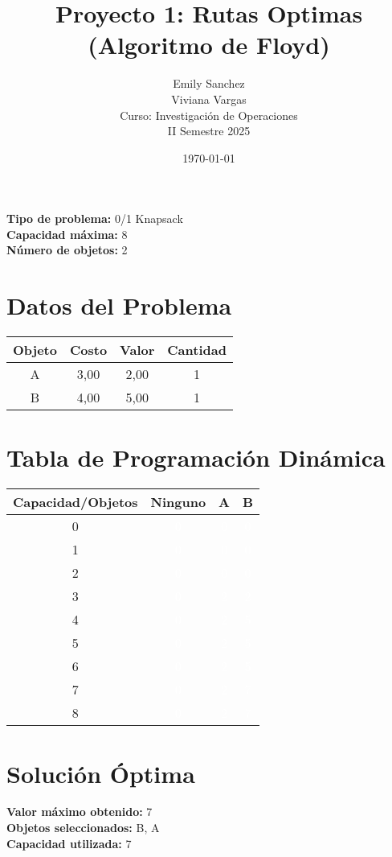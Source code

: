 \documentclass{article}
\title{Proyecto 1: Rutas Optimas (Algoritmo de Floyd)}
\author{Emily Sanchez \\ Viviana Vargas \\[1cm] Curso: Investigación de Operaciones \\ II Semestre 2025}
\date{\today}
\begin{document}
\maketitle

\thispagestyle{empty}
\newpage
\setcounter{page}{1}

\textbf{Tipo de problema:} 0/1 Knapsack\\
\textbf{Capacidad máxima:} 8\\
\textbf{Número de objetos:} 2\\

\clearpage
\section*{Datos del Problema}
\begin{tabular}{|c|c|c|c|}
\hline
Objeto & Costo & Valor & Cantidad \\
\hline
A & 3,00 & 2,00 & 1 \\
B & 4,00 & 5,00 & 1 \\
\hline
\end{tabular}

\section*{Tabla de Programación Dinámica}
\begin{center}
\scriptsize
\begin{tabular}{|c|c|c|c|}
\hline
Capacidad/Objetos & Ninguno & A & B \\ \hline
0 & \cellcolor{rojo}\textcolor{white}{0} & \cellcolor{rojo}\textcolor{white}{0} & \cellcolor{rojo}\textcolor{white}{0} \\ \hline
1 & \cellcolor{rojo}\textcolor{white}{0} & \cellcolor{rojo}\textcolor{white}{0} & \cellcolor{rojo}\textcolor{white}{0} \\ \hline
2 & \cellcolor{rojo}\textcolor{white}{0} & \cellcolor{rojo}\textcolor{white}{0} & \cellcolor{rojo}\textcolor{white}{0} \\ \hline
3 & \cellcolor{rojo}\textcolor{white}{0} & \cellcolor{verde}\textcolor{white}{2} & \cellcolor{rojo}\textcolor{white}{2} \\ \hline
4 & \cellcolor{rojo}\textcolor{white}{0} & \cellcolor{verde}\textcolor{white}{2} & \cellcolor{verde}\textcolor{white}{5} \\ \hline
5 & \cellcolor{rojo}\textcolor{white}{0} & \cellcolor{verde}\textcolor{white}{2} & \cellcolor{verde}\textcolor{white}{5} \\ \hline
6 & \cellcolor{rojo}\textcolor{white}{0} & \cellcolor{verde}\textcolor{white}{2} & \cellcolor{verde}\textcolor{white}{5} \\ \hline
7 & \cellcolor{rojo}\textcolor{white}{0} & \cellcolor{verde}\textcolor{white}{2} & \cellcolor{verde}\textcolor{white}{7} \\ \hline
8 & \cellcolor{rojo}\textcolor{white}{0} & \cellcolor{verde}\textcolor{white}{2} & \cellcolor{verde}\textcolor{white}{7} \\ \hline
\end{tabular}
\end{center}
\normalsize

\section*{Solución Óptima}
\textbf{Valor máximo obtenido:} 7\\
\textbf{Objetos seleccionados:} B, A\\
\textbf{Capacidad utilizada:} 7\\
\end{document}
